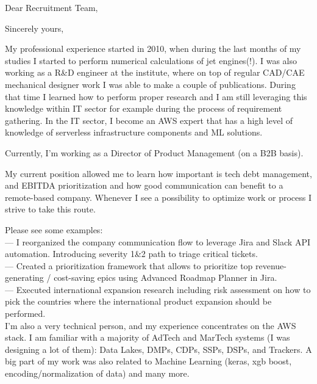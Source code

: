 \documentclass[11pt,a4paper,sans]{moderncv} %
\begin{document}


\date{\today} %
\opening{Dear Recruitment Team,}
\closing{Sincerely yours,} %

\makelettertitle{}

My professional experience started in 2010, when during the last months of my studies I started to perform numerical calculations of jet engines(!).
I was also working as a R\&D engineer at the institute, where on top of regular CAD/CAE mechanical designer work I was able to make a couple of publications.
During that time I learned how to perform proper research and I am still leveraging this knowledge within IT sector for example during the process of requirement gathering.
In the IT sector, I become an AWS expert that has a high level of knowledge of serverless infrastructure components and ML solutions.

Currently, I'm working as a Director of Product Management (on a B2B basis).

My current position allowed me to learn how important is tech debt management, and EBITDA prioritization and how good communication can benefit to a remote-based company.
Whenever I see a possibility to optimize work or process I strive to take this route.

Please see some examples:\\
  --- I reorganized the company communication flow to leverage Jira and Slack API automation. Introducing severity 1\&2 path to triage critical tickets. \\
  --- Created a prioritization framework that allows to prioritize top revenue-generating / cost-saving epics using Advanced Roadmap Planner in Jira. \\
  --- Executed international expansion research including risk assessment on how to pick the countries where the international product expansion should be performed. \\

I'm also a very technical person, and my experience concentrates on the AWS stack. I am familiar with a majority of AdTech and MarTech systems (I was designing a lot of them): Data Lakes, DMPs, CDPs, SSPs, DSPs, and Trackers. A big part of my work was also related to Machine Learning (keras, xgb boost, encoding/normalization of data) and many more. \\
\end{document}
